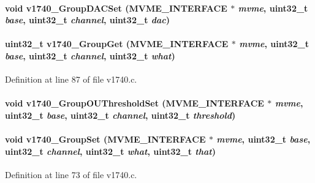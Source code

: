 \paragraph[{v1740\_\-GroupDACSet}]{\setlength{\rightskip}{0pt plus 5cm}void v1740\_\-GroupDACSet ({\bf MVME\_\-INTERFACE} $\ast$ {\em mvme}, \/  uint32\_\-t {\em base}, \/  uint32\_\-t {\em channel}, \/  uint32\_\-t {\em dac})}\hfill\label{v1740drv_8h_ae411bb9ddc1747fd523e08b062d69d65}
\paragraph[{v1740\_\-GroupGet}]{\setlength{\rightskip}{0pt plus 5cm}uint32\_\-t v1740\_\-GroupGet ({\bf MVME\_\-INTERFACE} $\ast$ {\em mvme}, \/  uint32\_\-t {\em base}, \/  uint32\_\-t {\em channel}, \/  uint32\_\-t {\em what})}\hfill\label{v1740drv_8h_a944b30b0d5a1020671125ffca5a73420}


Definition at line 87 of file v1740.c.
\paragraph[{v1740\_\-GroupOUThresholdSet}]{\setlength{\rightskip}{0pt plus 5cm}void v1740\_\-GroupOUThresholdSet ({\bf MVME\_\-INTERFACE} $\ast$ {\em mvme}, \/  uint32\_\-t {\em base}, \/  uint32\_\-t {\em channel}, \/  uint32\_\-t {\em threshold})}\hfill\label{v1740drv_8h_a4117afdb72935222ea66d56b85e3acc6}
\paragraph[{v1740\_\-GroupSet}]{\setlength{\rightskip}{0pt plus 5cm}void v1740\_\-GroupSet ({\bf MVME\_\-INTERFACE} $\ast$ {\em mvme}, \/  uint32\_\-t {\em base}, \/  uint32\_\-t {\em channel}, \/  uint32\_\-t {\em what}, \/  uint32\_\-t {\em that})}\hfill\label{v1740drv_8h_aa7ab1ae041ccb35fea9b5174e1290a2e}


Definition at line 73 of file v1740.c.
